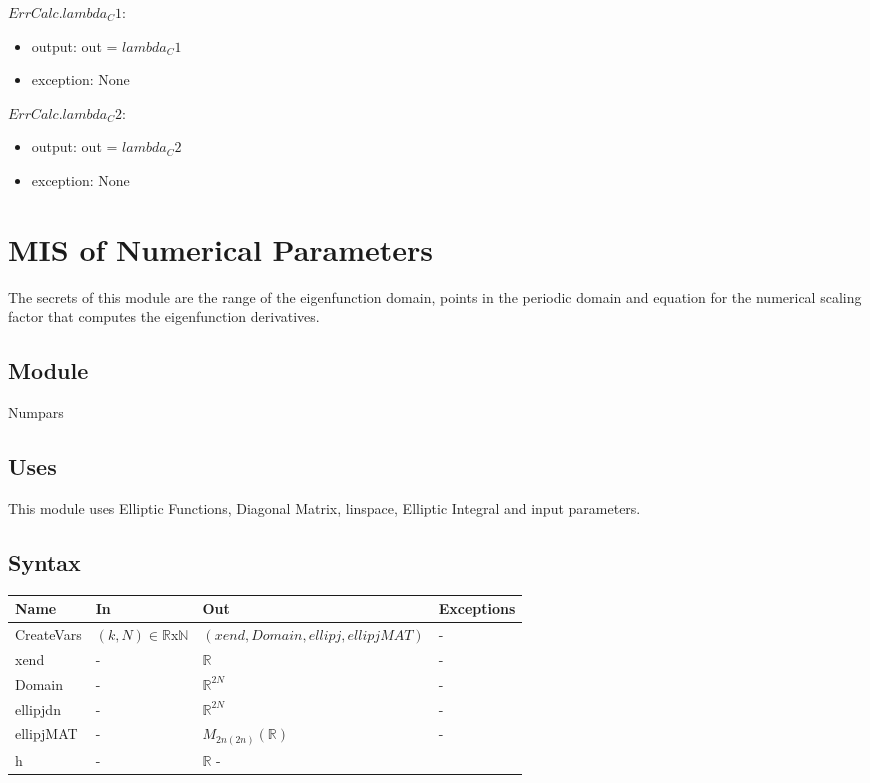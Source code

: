 \documentclass[12pt, titlepage]{article}
\begin{document}
\noindent $ErrCalc.lambda_C1$:
\begin{itemize}
	\item output: out = $lambda_C1$
	\item exception: None
\end{itemize}

\noindent $ErrCalc.lambda_C2$:
\begin{itemize}
	\item output: out = $lambda_C2$ 
	\item exception: None
\end{itemize}

\newpage 

\section{MIS of Numerical Parameters} 

The secrets of this module are the range of the eigenfunction domain, points in 
the 
periodic domain and equation for the numerical scaling factor that computes 
the 
eigenfunction derivatives. 

\subsection{Module}

Numpars

\subsection{Uses}

This module uses Elliptic Functions, Diagonal Matrix, linspace, Elliptic 
Integral and input parameters. 

\subsection{Syntax}

\begin{center}
	\begin{tabular}{p{3cm} p{3cm} p{7cm} >{\raggedright\arraybackslash}p{3cm}}
		\toprule
		\textbf{Name} & \textbf{In} & \textbf{Out} & \textbf{Exceptions} \\
		\hline
		CreateVars & $(k,N) \in \mathbb{R}$x$\mathbb{N}$ & 
		$(xend,Domain,ellipj,ellipjMAT)$ & - \\
		xend & - & $\mathbb{R}$ & - \\
		Domain & - & $\mathbb{R}^{2N}$ &- \\
		ellipjdn & - & $\mathbb{R}^{2N}$ &- \\
		ellipjMAT & - & $M_{2n(2n)}(\mathbb{R})$ &- \\
		h & - & $\mathbb{R}$ - \\ 
		\hline
	\end{tabular}
\end{center}
\end{document}
